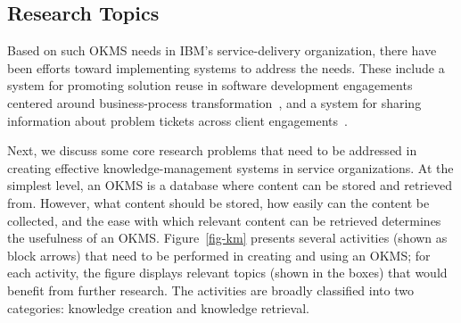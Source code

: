\subsection{Research Topics}

Based on such OKMS needs in IBM's service-delivery organization, there have been
efforts toward implementing systems to address the needs. These include a system
for promoting solution reuse in software development engagements centered around
business-process transformation~\cite{Goodwin:2012b}, and a system for sharing
information about problem tickets across client
engagements~\cite{Majumdar:2011}.

Next, we discuss some core research problems that need to be addressed in
creating effective knowledge-management systems in service organizations. At the
simplest level, an OKMS is a database where content can be stored and retrieved
from. However, what content should be stored, how easily can the content be
collected, and the ease with which relevant content can be retrieved determines
the usefulness of an OKMS.  Figure~\ref{fig-km} presents several activities
(shown as block arrows) that need to be performed in creating and using an OKMS;
for each activity, the figure displays relevant topics (shown in the boxes) that
would benefit from further research. The activities are broadly classified into
two categories: knowledge creation and knowledge retrieval.





